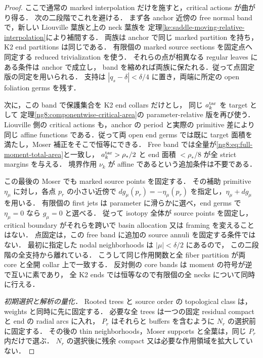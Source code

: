\begin{proof}
ここで通常の marked interpolation だけを施すと，critical actions が曲がり得る．
次の二段階でこれを避ける．
まず各 anchor 近傍の free normal band で，新しい Liouville 葉族と上の neck 葉族を
定理\ref{ke:saddle-moving-relative-interpolation}により補間する．
両族は anchor で同じ marked partition を持ち，K2 end partitions は同じである．
有限個の marked source sections を固定点へ同定する reduced trivialization を使う．
それらの点が相異なる regular leaves にある条件は anchor で成立し，
band を縮めれば両族に保たれる．従って点固定版の同定を用いられる．
支持は $|q_s-\delta|<\delta/4$ に置き，両端に所定の open foliation germs を残す．

次に，この band で保護集合を K2 end collars だけとし，
同じ $a_k^{\rm tar}$ を target として
定理\ref{ng8:componentwise-critical-area}の parameter-relative 版を再び使う．
Liouville 側の critical actions も，anchor の period と実際の primitive 差により
同じ affine functions である．従って両 open end germs では既に
target 面積を満たし，Moser 補正をそこで恒等にできる．
Free band では全量が\eqref{ng8:eq:full-moment-total-area}と一致し，
$a_k^{\rm tar}>\rho_*/2$ と end 面積 $<\rho_*/8$ が全 strict margins を与える．
境界作用 $\nu_k$ が affine であるという追加条件は不要である．

この最後の Moser でも marked source points を固定する．
その補助 primitive $\eta_\mu$ に対し，各点 $p_r$ の小さい近傍で
$dg_\mu(p_r)=-\eta_\mu(p_r)$ を指定し，$\eta_\mu+dg_\mu$ を用いる．
有限個の first jets は parameter に滑らかに選べ，end germs で
$\eta_\mu=0$ なら $g_\mu=0$ と選べる．
従って isotopy 全体が source points を固定し，critical boundary がそれらを跨いで
basin allocation 又は framing を変えることはない．
点固定は，この free band に追加の source annuli を固定する条件ではない．
最初に指定した nodal neighborhoods は $|\mu|<\delta/2$ にあるので，
この二段階の全支持から離れている．
こうして同じ作用関数と全 fiber partition が両 core と全開 collar 上で一致する．
反対側の core bands は moment の符号が逆で互いに素であり，
全 K2 ends では恒等なので有限個の全 necks について同時に行える．

\emph{初期選択と解析の量化．}
Rooted trees と source order の topological class は，weights と同時に先に固定する．
必要な全 trees は一つの固定 residual compact と end の radial arcs に入れ，
$P_r$ はそれらと buffers を含むように $N_r$ の選択前に固定する．
その後の thin neighborhoods，Moser supports と全葉は，同じ $P_r$ 内だけで選ぶ．
$N_r$ の選択後に残余 compact 又は必要な作用領域を拡大していない．


\end{proof}
